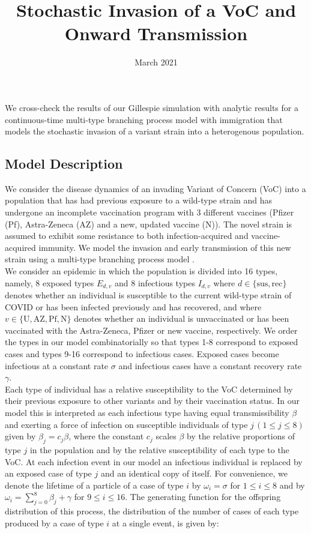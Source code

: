 \documentclass{article}
\title{Stochastic Invasion of a VoC and Onward Transmission}
\date{March 2021}
\begin{document}
\maketitle

We cross-check the results of our Gillespie simulation with analytic results for a continuous-time multi-type branching process model with immigration that models the stochastic invasion of a variant strain into a heterogenous population. \\

\subsection{Model Description}
We consider the disease dynamics of an invading Variant of Concern (VoC) into a population that has had previous exposure to a wild-type strain and has undergone an incomplete vaccination program with 3 different vaccines (Pfizer (Pf), Astra-Zeneca (AZ) and a new, updated vaccine (N)). The novel strain is assumed to exhibit some resistance to both infection-acquired and vaccine-acquired immunity. We model the invasion and early transmission of this new strain using a multi-type branching process model \cite{dorman2004garden}. \\ 

We consider an epidemic in which the population is divided into 16 types, namely, 8 exposed types $E_{d, v}$ and 8 infectious types $I_{d, v}$ where $d \in \{\mathrm{sus, rec}\}$ denotes whether an individual is susceptible to the current wild-type strain of COVID or has been infected previously and has recovered,  and where $v\in\{ \mathrm{U, AZ, Pf, N}\}$ denotes whether an individual is unvaccinated or has been vaccinated with the Astra-Zeneca, Pfizer or new vaccine, respectively. We order the types in our model combinatorially so that types 1-8 correspond to exposed cases and types 9-16 correspond to infectious cases. Exposed cases become infectious at a constant rate $\sigma$ and infectious cases have a constant recovery rate $\gamma$. \\

Each type of individual has a relative susceptibility to the VoC determined by their previous exposure to other variants and by their vaccination status. In our model this is interpreted as each infectious type having equal transmissibility $\beta$ and exerting a force of infection on susceptible individuals of type $j \, (1 \leq j \leq 8)$ given by $\beta_j = c_j \beta$, where the constant $c_j$ scales $\beta$ by the relative proportions of type $j$ in the population and by the relative susceptibility of each type to the VoC. At each infection event in our model an infectious individual is replaced by an exposed case of type $j$ and an identical copy of itself. For convenience, we denote the lifetime of a particle of a case of type $i$ by $\omega_i = \sigma$ for  $1 \leq i \leq 8$ and by $\omega_i = \sum_{j=0}^8 \beta_j + \gamma$ for $9 \leq i \leq 16$. The generating function for the offspring distribution of this process, the distribution of the number of cases of each type produced by a case of type $i$ at a single event, is given by:
\end{document}
